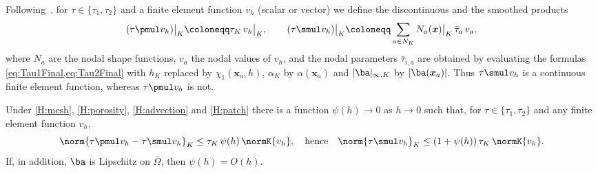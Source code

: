 Following~\cite{codina2008analysis}, for $\tau \in \{\tau_1, \tau_2\}$ and a finite element
function $v_h$ (scalar or vector) we define the discontinuous and the smoothed
products
\begin{equation}
  \label{oa:eq:SmulDef}
  (\tau \pmul v_h)\big|_K \coloneqq \tau_{K}\, v_h\big|_K,
  \qquad
  (\tau \smul v_h)\big|_K \coloneqq \sum_{a \in N_K} N_a(\boldsymbol{x})\big|_K\,
  \bar\tau_{a}\, v_a,
\end{equation}
where $N_a$ are the nodal shape functions, $v_a$ the nodal values of $v_h$, and the
nodal parameters $\bar\tau_{i,a}$ are obtained by evaluating the formulas
\cref{eq:Tau1Final,eq:Tau2Final} with $h_K$ replaced by $\chi_1(\boldsymbol{x}_a, h)$,
$\alpha_K$ by $\alpha(\boldsymbol{x}_a)$ and $|\ba|_{\infty,K}$ by
$|\ba(\boldsymbol{x}_a)|$. Thus $\tau \smul v_h$ is a continuous finite element
function, whereas $\tau \pmul v_h$ is not.

\begin{lemma}
\label{oa:lem:smoothing}
Under \cref{H:mesh}, \cref{H:porosity}, \cref{H:advection} and \cref{H:patch} there is a function $\psi(h) \to 0$
as $h \to 0$ such that, for $\tau \in \{\tau_1, \tau_2\}$ and any finite element
function $v_h$,
\begin{equation}
  \label{oa:eq:Smoothing}
  \norm{\tau\pmul v_h - \tau\smul v_h}_{K} \le \tau_K\,\psi(h)\,\normK{v_h},
  \quad\text{hence}\quad
  \norm{\tau\smul v_h}_{K} \le (1+\psi(h))\,\tau_K\,\normK{v_h}.
\end{equation}
If, in addition, $\ba$ is Lipschitz on $\overline\Omega$, then $\psi(h) = O(h)$.
\end{lemma}

